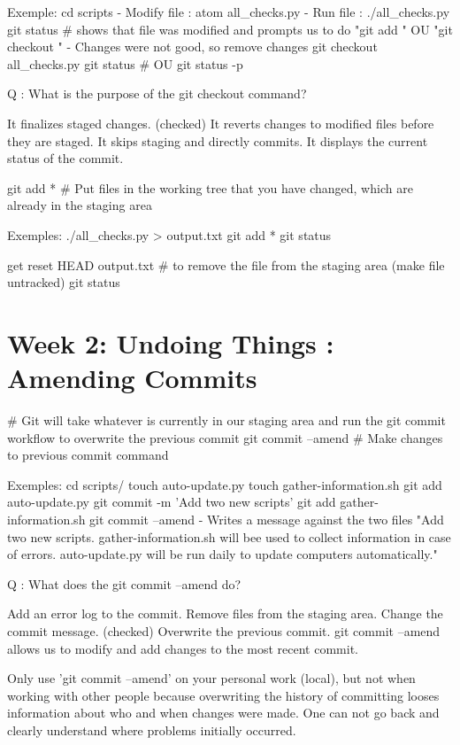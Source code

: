 \documentclass[11pt, onecolumn]{article}
\begin{document}
Exemple:
cd scripts
- Modify file : atom all_checks.py
- Run file : ./all_checks.py
git status  # shows that file was modified and prompts us to do "git add " OU "git checkout "
- Changes were not good, so remove changes
git checkout all_checks.py
git status
# OU
git status -p

Q : What is the purpose of the git checkout command?

It finalizes staged changes.
(checked) It reverts changes to modified files before they are staged.
It skips staging and directly commits.
It displays the current status of the commit.

git add *   # Put files in the working tree that you have changed, which are already in the staging area


Exemples:
./all_checks.py > output.txt
git add *
git status

get reset HEAD output.txt   # to remove the file from the staging area (make file untracked)
git status 


\section{Week 2: Undoing Things : Amending Commits}

# Git will take whatever is currently in our staging area and run the git commit workflow to overwrite the previous commit
git commit --amend  # Make changes to previous commit command

Exemples:
cd scripts/
touch auto-update.py
touch gather-information.sh
git add auto-update.py
git commit -m 'Add two new scripts'
git add gather-information.sh
git commit --amend
- Writes a message against the two files
"Add two new scripts.  gather-information.sh will bee used to collect information in case of errors. auto-update.py will be run daily to update computers automatically."


Q : What does the git commit --amend do?

Add an error log to the commit.
Remove files from the staging area.
Change the commit message.
(checked) Overwrite the previous commit. 
git commit --amend allows us to modify and add changes to the most recent commit. 

Only use 'git commit --amend' on your personal work (local), but not when working with other people because overwriting the history of committing looses information about who and when changes were made. One can not go back and clearly understand where problems initially occurred.
\end{document}
